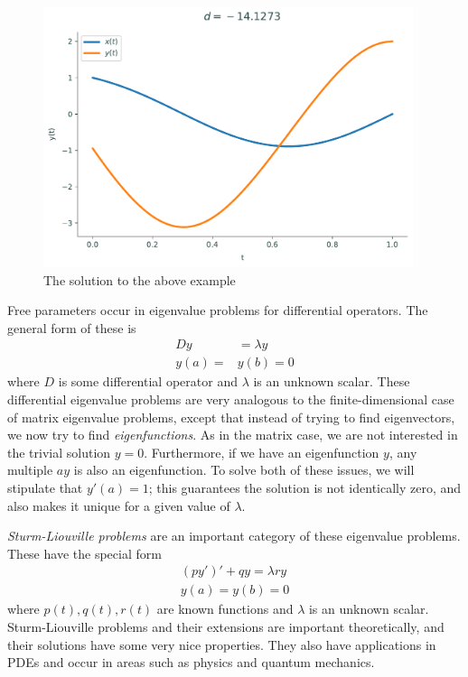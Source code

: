 \begin{figure}[H]
    \centering
    \includegraphics[height=3in]{figures/bvp_param_example.pdf}
    \caption{The solution to the above example}
\end{figure}

Free parameters occur in eigenvalue problems for differential operators.
The general form of these is
\begin{align*}
Dy&=\lambda y \\
y(a)=&y(b)=0
\end{align*}
where \(D\) is some differential operator and \(\lambda\) is an unknown scalar.
These differential eigenvalue problems are very analogous to the finite-dimensional case of matrix eigenvalue problems, except that instead of trying to find eigenvectors, we now try to find \textit{eigenfunctions}.
As in the matrix case, we are not interested in the trivial solution \(y=0\).
Furthermore, if we have an eigenfunction \(y\), any multiple \(ay\) is also an eigenfunction.
To solve both of these issues, we will stipulate that \(y'(a)=1\); this guarantees the solution is not identically zero, and also makes it unique for a given value of \(\lambda\). %

\textit{Sturm-Liouville problems} are an important category of these eigenvalue problems.
These have the special form
\begin{align*}
(py')'+qy = \lambda ry \\
y(a)=y(b)=0
\end{align*}
where \(p(t), q(t), r(t)\) are known functions and \(\lambda\) is an unknown scalar.
Sturm-Liouville problems and their extensions are important theoretically, and their solutions have some very nice properties.
They also have applications in PDEs and occur in areas such as physics and quantum mechanics.

